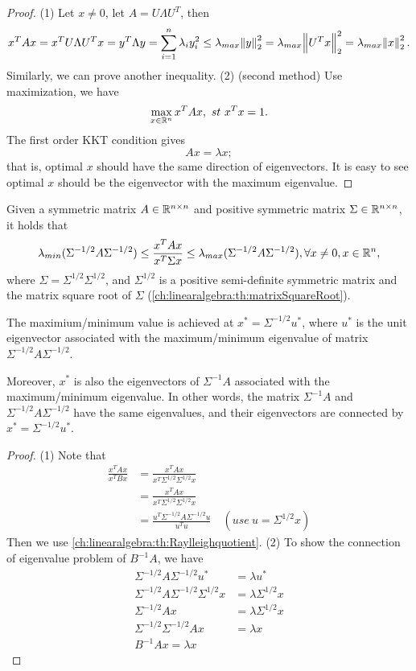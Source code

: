\begin{refsection}
\begin{proof}
	(1) Let $x\neq 0$, let $A = U\Lambda U^T$, then
	$$x^TAx = x^TU \Lambda U^Tx = y^T\Lambda y = \sum_{i=1}^n \lambda_i y_i^2 \leq \lambda_{max} \norm{y}_2^2 = \lambda_{max} \norm{U^Tx}_2^2 = \lambda_{max} \norm{x}_2^2.$$
	Similarly, we can prove another inequality.
	(2) (second method) Use maximization, we have
	$$\max_{x\in \mathbb{R}^n } x^T A x, ~st~ x^Tx = 1.$$
	The first order KKT condition gives
	$$Ax = \lambda x;$$
	that is, optimal $x$ should have the same direction of eigenvectors. It is easy to see optimal $x$ should be the eigenvector with the maximum eigenvalue. 
\end{proof}

\begin{corollary}\label{ch:linearalgebra:th:GeneralizedRaylleighquotient}
	Given a symmetric matrix $A\in \mathbb{R}^{n\times n}$ and positive symmetric matrix $\Sigma\in \mathbb{R}^{n\times n}$, it holds that 
	$$\lambda_{min}(\Sigma^{-1/2} A\Sigma^{-1/2})\leq \frac{x^TAx}{x^T\Sigma x} \leq \lambda_{max}(\Sigma^{-1/2} A\Sigma^{-1/2}),\forall x\neq 0, x\in \mathbb{R}^n,$$
	where $\Sigma = \Sigma^{1/2}\Sigma^{1/2}$, and $\Sigma^{1/2}$ is a positive semi-definite symmetric matrix and the matrix square root of $\Sigma$ (\autoref{ch:linearalgebra:th:matrixSquareRoot}). 
	
	The maximium/minimum value is achieved at $x^* = \Sigma^{-1/2}u^*$, where $u^*$ is the unit eigenvector associated with the maximum/minimum eigenvalue of matrix $\Sigma^{-1/2} A\Sigma^{-1/2}$.
	
	Moreover, $x^*$ is also the eigenvectors of $\Sigma^{-1}A$ associated with the maximum/minimum eigenvalue. In other words, the matrix $\Sigma^{-1}A$ and $\Sigma^{-1/2} A\Sigma^{-1/2}$ have the same eigenvalues, and their eigenvectors are connected by $x^* = \Sigma^{-1/2}u^*$.
\end{corollary}
\begin{proof}
	(1) Note that	
	\begin{align*}
	\frac{x^TAx}{x^TBx} &= \frac{x^TAx}{x^T\Sigma^{1/2}\Sigma^{1/2}x} \\
	&= \frac{x^TAx}{x^T\Sigma^{1/2}\Sigma^{1/2}x} \\
	&= \frac{u^T\Sigma^{-1/2}A\Sigma^{-1/2}u}{u^Tu} \quad(use~u = \Sigma^{1/2}x) 
	\end{align*}
	Then we use \autoref{ch:linearalgebra:th:Raylleighquotient}.
	(2) To show the connection of eigenvalue problem of $B^{-1}A$, we have
	\begin{align*}
	\Sigma^{-1/2}A\Sigma^{-1/2}u^* &= \lambda u^* \\
	\Sigma^{-1/2}A\Sigma^{-1/2}\Sigma^{1/2}x &= \lambda \Sigma^{1/2}x \\
	\Sigma^{-1/2}Ax &= \lambda \Sigma^{1/2}x \\
	\Sigma^{-1/2}\Sigma^{-1/2}Ax &= \lambda x \\
	B^{-1}Ax = \lambda x
	\end{align*}
\end{proof}



\end{refsection}
